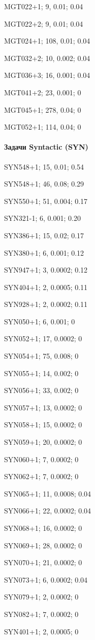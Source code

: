 MGT022+1; 9, 0.01; 0.04

MGT022+2; 9, 0.01; 0.04

MGT024+1; 108, 0.01; 0.04

MGT032+2; 10, 0.002; 0.04

MGT036+3; 16, 0.001; 0.04

MGT041+2; 23, 0.001; 0

MGT045+1; 278, 0.04; 0

MGT052+1; 114, 0.04; 0


\paragraph{Задачи Syntactic (SYN)}

SYN548+1; 15, 0.01; 0.54

SYN548+1; 46, 0.08; 0.29

SYN550+1; 51, 0.004; 0.17

SYN321-1; 6, 0.001; 0.20

SYN386+1; 15, 0.02; 0.17

SYN380+1; 6, 0.001; 0.12

SYN947+1; 3, 0.0002; 0.12

SYN404+1; 2, 0.0005; 0.11

SYN928+1; 2, 0.0002; 0.11

SYN050+1; 6, 0.001; 0

SYN052+1; 17, 0.0002; 0

SYN054+1; 75, 0.008; 0

SYN055+1; 14, 0.002; 0

SYN056+1; 33, 0.002; 0

SYN057+1; 13, 0.0002; 0

SYN058+1; 15, 0.0002; 0

SYN059+1; 20, 0.0002; 0

SYN060+1; 7, 0.0002; 0

SYN062+1; 7, 0.0002; 0

SYN065+1; 11, 0.0008; 0.04

SYN066+1; 22, 0.0002; 0.04

SYN068+1; 16, 0.0002; 0

SYN069+1; 28, 0.0002; 0

SYN070+1; 21, 0.0002; 0

SYN073+1; 6, 0.0002; 0.04

SYN079+1; 2, 0.0002; 0

SYN082+1; 7, 0.0002; 0

SYN401+1; 2, 0.0005; 0

